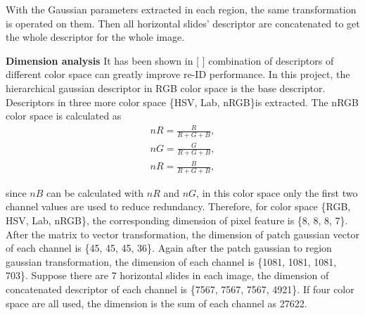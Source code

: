 With the Gaussian parameters extracted in each region, the same transformation is operated on them. Then all horizontal slides' descriptor are concatenated to get the whole descriptor for the whole image.

\textbf{Dimension analysis} It has been shown in [ ]  combination of descriptors of different color space can greatly improve re-ID performance. In this project, the hierarchical gaussian descriptor in RGB color space is the base descriptor. Descriptors in three more color space \{HSV, Lab, nRGB\}is extracted. The nRGB color space is calculated as 
\begin{equation}
\begin{aligned}
nR = \frac{R}{R+G+B},\\
nG = \frac{G}{R+G+B},\\
nR = \frac{B}{R+G+B}, 
\end{aligned}
\end{equation}

since $nB$ can be calculated with $nR$ and $nG$, in this color space only the first two channel values are used to reduce redundancy. Therefore, for color space \{RGB, HSV, Lab, nRGB\}, the corresponding dimension of pixel feature is \{8, 8, 8, 7\}. After the matrix to vector transformation, the dimension of patch gaussian vector of each channel is \{45, 45, 45, 36\}. Again after the patch gaussian to region gaussian transformation, the dimension of each channel is \{1081, 1081, 1081, 703\}. Suppose there are 7 horizontal slides in each image, the dimension of concatenated descriptor of each channel is \{7567, 7567, 7567, 4921\}. If four color space are all used, the dimension is the sum of each channel as 27622. 





